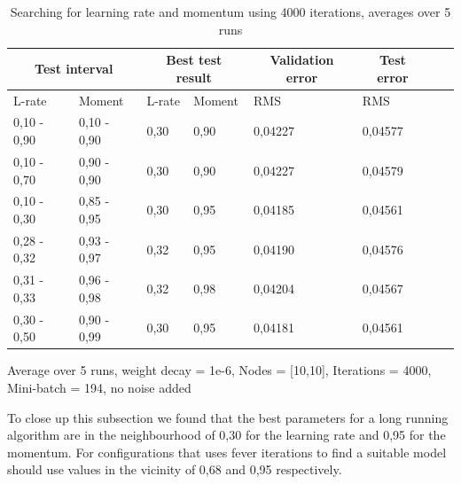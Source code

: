 \begin{table}[H]
\begin{threeparttable}
\begin{tabular}{ | p{1.6cm} | p{1.6cm} | l | l | l | l | l | l | } 
\hline 
\multicolumn{2}{|c|}{Test interval} & \multicolumn{2}{|c|}{Best test result} & \multicolumn{1}{|c|}{Validation error}  & \multicolumn{1}{|c|}{Test error} \\
\hline 
L-rate & Moment & L-rate & Moment & RMS & RMS  \\
\hline
0,10 - 0,90 & 0,10 - 0,90 & 0,30 & 0,90 & 0,04227 & 0,04577 \\ %
\hline
0,10 - 0,70 & 0,90 - 0,90 & 0,30 & 0,90 &0,04227 & 0,04579 \\ %
\hline
0,10 - 0,30 & 0,85 - 0,95 & 0,30 & 0,95 & 0,04185 & 0,04561 \\ %
\hline
0,28 - 0,32 & 0,93 - 0,97 & 0,32 & 0,95 & 0,04190 & 0,04576 \\ %
\hline
0,31 - 0,33 & 0,96 - 0,98 & 0,32 & 0,98 & 0,04204 & 0,04567 \\ %
\hline
0,30 - 0,50 & 0,90 - 0,99 & 0,30 & 0,95 & 0,04181 & 0,04561 \\ %


\hline
\end{tabular}
\begin{tablenotes}
      \small
      \item Average over 5 runs, weight decay = 1e-6, Nodes = [10,10], Iterations = 4000, Mini-batch = 194, no noise added
\end{tablenotes}
\caption{Searching for learning rate and momentum using 4000 iterations, averages over 5 runs}
\label{tab:first_param_tuning4k}
\end{threeparttable}
\end{table}
To close up this subsection we found that the best parameters for a long running algorithm are in the neighbourhood of 0,30 for the learning rate and 0,95 for the momentum. For configurations that uses fever iterations to find a suitable model should use values in the vicinity of 0,68 and 0,95 respectively. 


